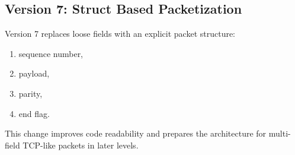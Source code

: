 \clearpage
\subsection{Version 7: Struct Based Packetization}
Version 7 replaces loose fields with an explicit packet structure:
\begin{enumerate}
    \item sequence number,
    \item payload,
    \item parity,
    \item end flag.
\end{enumerate}

This change improves code readability and prepares the architecture for
multi-field TCP-like packets in later levels.

\vspace{1.5\baselineskip}
